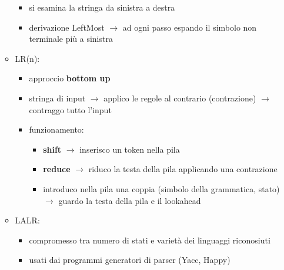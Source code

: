 \documentclass{article}
\begin{document}
\begin{itemize}
\begin{itemize}
\begin{itemize}
\begin{itemize}
      \end{itemize}
      \item si esamina la stringa da sinistra a destra
      \item derivazione LeftMost $\rightarrow$ ad ogni passo espando il simbolo non terminale più a sinistra
    \end{itemize}
    \item LR(n):
    \begin{itemize}
      \item approccio \textbf{bottom up}
      \item stringa di input $\rightarrow$ applico le regole al contrario (contrazione) $\rightarrow$ contraggo tutto l'input
      \item funzionamento:
      \begin{itemize}
        \item \textbf{shift} $\rightarrow$ inserisco un token nella pila
        \item \textbf{reduce} $\rightarrow$ riduco la testa della pila applicando una contrazione
        \item introduco nella pila una coppia (simbolo della grammatica, stato) $\rightarrow$ guardo la testa della pila e il lookahead 
      \end{itemize}
    \end{itemize}
    \item LALR:
    \begin{itemize}
      \item compromesso tra numero di stati e varietà dei linguaggi riconosiuti
      \item usati dai programmi generatori di parser (Yacc, Happy)
    \end{itemize}
  \end{itemize}
\end{itemize}
\end{document}
